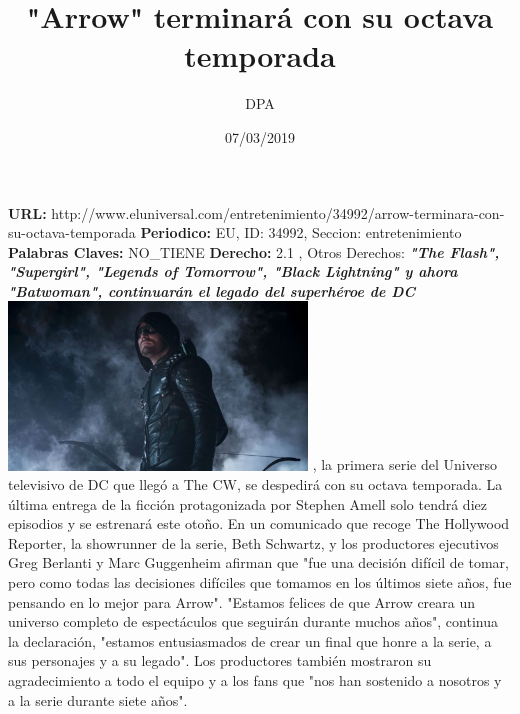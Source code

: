 \documentclass{article}%
\title{\textbf{"Arrow" terminará con su octava temporada}}%
\author{DPA}%
\date{07/03/2019}%
\begin{document}
%
\normalsize%
\maketitle%
\textbf{URL: }%
http://www.eluniversal.com/entretenimiento/34992/arrow{-}terminara{-}con{-}su{-}octava{-}temporada\newline%
%
\textbf{Periodico: }%
EU, %
ID: %
34992, %
Seccion: %
entretenimiento\newline%
%
\textbf{Palabras Claves: }%
NO\_TIENE\newline%
%
\textbf{Derecho: }%
2.1%
, Otros Derechos: %
\newline%
%
\textbf{\textit{"The Flash", "Supergirl", "Legends of Tomorrow", "Black Lightning" y ahora "Batwoman", continuarán el legado del superhéroe de DC}}%
\newline%
\newline%
%
\includegraphics[width=300px]{EU_34992.jpg}%
\newline%
%
, la primera serie del Universo televisivo de DC que llegó a The CW, se despedirá con su octava temporada. La última entrega de la ficción protagonizada por Stephen Amell solo tendrá diez episodios y se estrenará este otoño.%
\newline%
%
En un comunicado que recoge The Hollywood Reporter, la showrunner de la serie, Beth Schwartz, y los productores ejecutivos Greg Berlanti y Marc Guggenheim afirman que "fue una decisión difícil de tomar, pero como todas las decisiones difíciles que tomamos en los últimos siete años, fue pensando en lo mejor para Arrow".%
\newline%
%
"Estamos felices de que Arrow creara un universo completo de espectáculos que seguirán durante muchos años", continua la declaración, "estamos entusiasmados de crear un final que honre a la serie, a sus personajes y a su legado".%
\newline%
%
Los productores también mostraron su agradecimiento a todo el equipo y a los fans que "nos han sostenido a nosotros y a la serie durante siete años".%
\newline%
\end{document}
